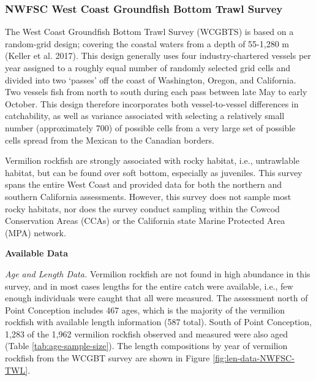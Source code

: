 \documentclass[11pt,
  english,
]{article}
\begin{document}
\hypertarget{nwfsc-west-coast-groundfish-bottom-trawl-survey}{%
\subsubsection{NWFSC West Coast Groundfish Bottom Trawl Survey}\label{nwfsc-west-coast-groundfish-bottom-trawl-survey}}

\leavevmode\tagmcend\tagstructend

The West Coast Groundfish Bottom Trawl Survey (WCGBTS) is based on a random-grid design; covering the coastal waters from a depth of 55-1,280 m {(Keller et al. 2017)\leavevmode\tagmcend\tagstructend}. This design generally uses four industry-chartered vessels per year assigned to a roughly equal number of randomly selected grid cells and divided into two `passes' off the coast of Washington, Oregon, and California. Two vessels fish from north to south during each pass between late May to early October. This design therefore incorporates both vessel-to-vessel differences in catchability, as well as variance associated with selecting a relatively small number (approximately 700) of possible cells from a very large set of possible cells spread from the Mexican to the Canadian borders.

Vermilion rockfish are strongly associated with rocky habitat, i.e., untrawlable habitat, but can be found over soft bottom, especially as juveniles. This survey spans the entire West Coast and provided data for both the northern and southern California assessments. However, this survey does not sample most rocky habitats, nor does the survey conduct sampling within the Cowcod Conservation Areas (CCAs) or the California state Marine Protected Area (MPA) network.

\textbf{Available Data}

\emph{Age and Length Data.} Vermilion rockfish are not found in high abundance in this survey, and in most cases lengths for the entire catch were available, i.e., few enough individuals were caught that all were measured. The assessment north of Point Conception includes 467 ages, which is the majority of the vermilion rockfish with available length information (587 total). South of Point Conception, 1,283 of the 1,962 vermilion rockfish observed and measured were also aged (Table \ref{tab:age-sample-size}). The length compositions by year of vermilion rockfish from the WCGBT survey are shown in Figure \ref{fig:len-data-NWFSC-TWL}.
\end{document}
